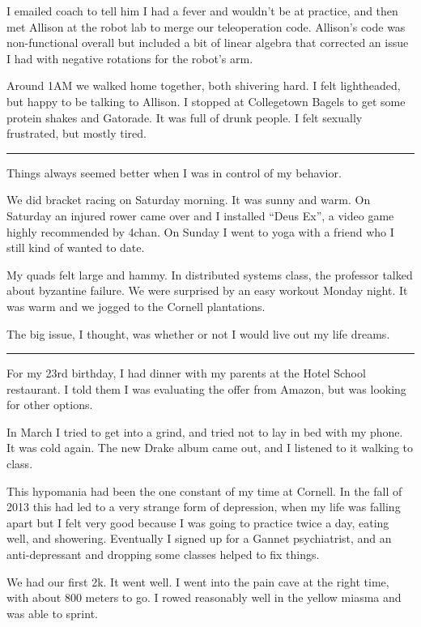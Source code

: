 I emailed coach to tell him I had a fever and wouldn't be at practice, and then
met Allison at the robot lab to merge our teleoperation code.   Allison's code
was non-functional overall but included a bit of linear algebra that corrected
an issue I had with negative rotations for the robot's arm.

Around 1AM we walked home together, both shivering hard.  I felt lightheaded,
but happy to be talking to Allison.  I stopped at Collegetown Bagels to get some
protein shakes and Gatorade.  It was full of drunk people.  I felt sexually
frustrated, but mostly tired.

\plainfancybreak{12pt}{2}{* * *}

Things always seemed better when I was in control of my behavior.

We did bracket racing on Saturday morning.  It was sunny and warm.    On
Saturday an injured rower came over and I installed ``Deus Ex'', a video game
highly recommended by 4chan.   On Sunday I went to yoga with a friend who I
still kind of wanted to date.

My quads felt large and hammy.  In distributed systems class, the professor
talked about byzantine failure.  We were surprised by an easy workout Monday
night.  It was warm and we jogged to the Cornell plantations.

The big issue, I thought, was whether or not I would live out my life dreams.

\plainfancybreak{12pt}{2}{* * *}

For my 23rd birthday, I had dinner with my parents at the Hotel School
restaurant.  I told them I was evaluating the offer from Amazon, but was looking
for other options.

In March I tried to get into a grind, and tried not to lay in bed with my phone.
It was cold again.  The new Drake album came out, and I listened to it walking
to class.  

This hypomania had been the one constant of my time at Cornell.  In the fall of
2013 this had led to a very strange form of depression, when my life was falling
apart but I felt very good because I was going to practice twice a day, eating
well, and showering.  Eventually I signed up for a Gannet psychiatrist, and an
anti-depressant and dropping some classes helped to fix things.

We had our first 2k.  It went well.  I went into the pain cave at the right
time, with about 800 meters to go.  I rowed reasonably well in the yellow miasma
and was able to sprint.  

